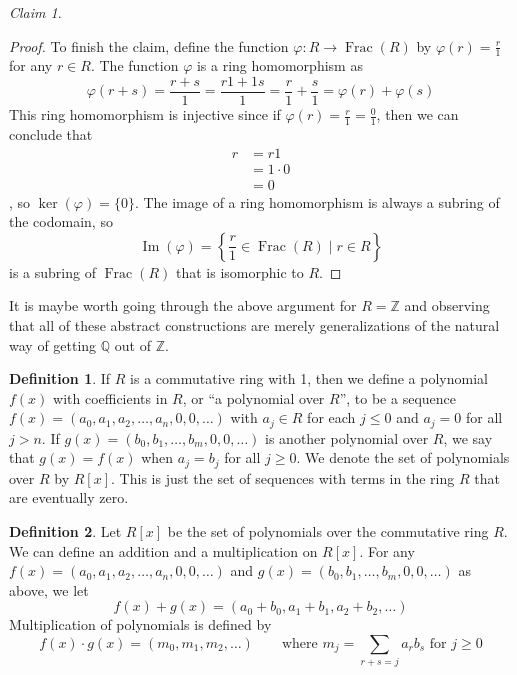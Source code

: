 \documentclass[12pt,letterpaper,DIV=11,final]{scrartcl}
\theoremstyle{plain}
\theoremstyle{definition}
\newtheorem{definition}{Definition}[section]
\theoremstyle{remark}
\newtheorem{claim}{Claim}
\DeclareMathOperator{\ima}{Im}
\DeclareMathOperator{\Frac}{Frac}
\begin{document}
\begin{claim}
\begin{proof}
    To finish the claim, define the function $\varphi : R \to \Frac(R)$ by $\varphi(r) = \frac{r}{1}$ for any $r \in R$.
    The function $\varphi$ is a ring homomorphism as
    \begin{displaymath}
      \varphi(r + s) = \frac{r + s}{1} = \frac{r1 + 1s}{1} = \frac{r}{1} + \frac{s}{1} = \varphi(r) + \varphi(s)
    \end{displaymath}
    This ring homomorphism is injective since if $\varphi(r) = \frac{r}{1} = \frac{0}{1}$, then we can conclude that
    \begin{align*}
      r &= r1 \\
        &= 1 \cdot 0 \\
        &= 0
    \end{align*}
    , so $\ker(\varphi) = \{ 0 \}$.
    The image of a ring homomorphism is always a subring of the codomain, so
    \begin{displaymath}
      \ima(\varphi) = \left\{ \frac{r}{1} \in \Frac(R) \mid r \in R \right\}
    \end{displaymath}
    is a subring of $\Frac(R)$ that is isomorphic to $R$.
  \end{proof}
\end{claim}

It is maybe worth going through the above argument for $R = \mathbb{Z}$ and observing that all of these abstract constructions are merely generalizations of the natural way of getting $\mathbb{Q}$ out of $\mathbb{Z}$.

\begin{definition}\label{def:poly}
  If $R$ is a commutative ring with 1, then we define a polynomial $f(x)$ with coefficients in $R$, or \enquote{a polynomial over $R$}, to be a sequence $f(x) = (a_0, a_1, a_2, \dots, a_n, 0, 0, \dots)$ with $a_j \in R$ for each $j \leq 0$ and $a_j = 0$ for all $j > n$.
  If $g(x) = (b_0, b_1, \dots, b_m, 0, 0, \dots)$ is another polynomial over $R$, we say that $g(x) = f(x)$ when $a_j = b_j$ for all $j \geq 0$.
  We denote the set of polynomials over $R$ by $R[x]$.
  This is just the set of sequences with terms in the ring $R$ that are eventually zero.
\end{definition}

\begin{definition}
  Let $R[x]$ be the set of polynomials over the commutative ring $R$.
  We can define an addition and a multiplication on $R[x]$.
  For any $f(x) = (a_0, a_1, a_2, \dots, a_n, 0, 0, \dots)$ and $g(x) = (b_0, b_1, \dots, b_m, 0, 0, \dots)$ as above, we let
  \begin{equation}\label{def:poly_add}
    f(x) + g(x) = (a_0 + b_0, a_1 + b_1, a_2 + b_2, \dots)
  \end{equation}
  Multiplication of polynomials is defined by
  \begin{equation}\label{def:poly_mul}
    f(x) \cdot g(x) = (m_0, m_1, m_2, \dots) \qquad \text{where $m_j = \sum_{r + s = j} a_r b_s$ for $j \geq 0$}
  \end{equation}
\end{definition}
\end{document}

